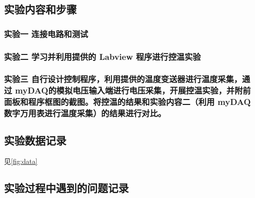 \documentclass[dvipsnames, svgnames,a4paper,11pt]{article}
\begin{document}
\subsection{实验内容和步骤}

	\subsubsection{实验一 \quad 连接电路和测试}
	



	\subsubsection{实验二 \quad 学习并利用提供的 Labview 程序进行控温实验}





	\subsubsection{实验三 \quad 自行设计控制程序，利用提供的温度变送器进行温度采集，通过 myDAQ的模拟电压输入端进行电压采集，开展控温实验，并附前面板和程序框图的截图。将控温的结果和实验内容二（利用 myDAQ 数字万用表进行温度采集）的结果进行对比。}




\subsection{实验数据记录}

	见\cref{fig:data}









\subsection{实验过程中遇到的问题记录}
\end{document}
